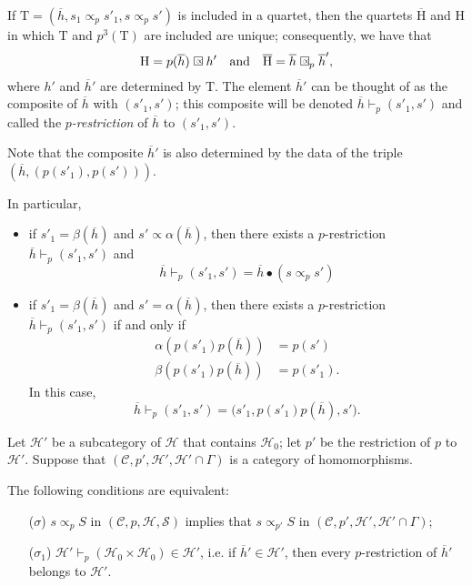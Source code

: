 \documentclass[a4paper,fleqn]{article}
\theoremstyle{plain}
\newenvironment{proposition}[1]
  {\renewcommand\theinnerproposition{#1}\innerproposition}
  {\endinnerproposition}
\theoremstyle{definition}
\newcommand{\oldpage}[1]{{\marginpar{\footnotesize$\bigg\vert$\,\,\,\,\textit{p.~#1}}}}
\newcommand{\textand}{\quad\text{and}\quad}
\newcommand{\CC}{\mathcal{C}}
\newcommand{\HH}{\mathcal{H}}
\newcommand{\rHH}{\mathrm{H}}
\renewcommand{\SS}{\mathcal{S}}
\newcommand{\subs}{\mathrel{\propto}}
\newcommand{\sqsubs}{\mathrel{\mathrlap{\square}\raisebox{.17em}{\scaleobj{0.65}{\,\,\propto}}}}
\newcommand{\smallbullet}{\bullet}
\begin{document}
If $\mathrm{T}=(\overline{h},s_1\subs_p s'_1,s\subs_p s')$ is included in a quartet, then the quartets $\overline{\rHH}$ and $\rHH$ in which $\mathrm{T}$ and $p^3(\mathrm{T})$ are included are unique;
consequently, we have that
\[
  \rHH = p(\overline{h})\sqsubs h'
  \textand
  \overline{\rHH} = \overline{h}\sqsubs_p \overline{h}',
\]
\oldpage{367}
where $h'$ and $\overline{h}'$ are determined by $\mathrm{T}$.
The element $\overline{h}'$ can be thought of as the composite of $\overline{h}$ with $(s'_1,s')$;
this composite will be denoted $\overline{h}\vdash_p(s'_1,s')$ and called the \emph{$p$-restriction} of $\overline{h}$ to $(s'_1,s')$.

Note that the composite $\overline{h}'$ is also determined by the data of the triple $(\overline{h},(p(s'_1),p(s')))$.

In particular,

\begin{itemize}
  \item if $s'_1=\beta(\overline{h})$ and $s'\subs\alpha(\overline{h})$, then there exists a $p$-restriction $\overline{h}\vdash_p(s'_1,s')$ and
    \[
      \overline{h}\vdash_p(s'_1,s')
      = \overline{h}\smallbullet(s\subs_p s')
    \]
  \item if $s'_1=\beta(\overline{h})$ and $s'=\alpha(\overline{h})$, then there exists a $p$-restriction $\overline{h}\vdash_p(s'_1,s')$ if and only if
    \[
      \begin{aligned}
        \alpha(p(s'_1)p(\overline{h}))
        &= p(s')
      \\\beta(p(s'_1)p(\overline{h}))
        &= p(s'_1).
      \end{aligned}
    \]
    In this case,
    \[
      \overline{h}\vdash_p(s'_1,s')
      = \big(
        s'_1, p(s'_1)p(\overline{h}), s'
      \big).
    \]
\end{itemize}

Let $\HH'$ be a subcategory of $\HH$ that contains $\HH_0$;
let $p'$ be the restriction of $p$ to $\HH'$.
Suppose that $(\CC,p',\HH',\HH'\cap\Gamma)$ is a category of homomorphisms.

\begin{proposition}{10}
\label{proposition:i-10}
  The following conditions are equivalent:

  \begin{enumerate}
    \item[\normalfont($\sigma$)] $s\subs_p S$ in $(\CC,p,\HH,\SS)$ implies that $s\subs_{p'}S$ in $(\CC,p',\HH',\HH'\cap\Gamma)$;

    \item[\normalfont($\sigma_1$)] $\HH'\vdash_p(\HH_0\times\HH_0)\in\HH'$, i.e. if $\overline{h}'\in\HH'$, then every $p$-restriction of $\overline{h}'$ belongs to $\HH'$.
  \end{enumerate}
\end{proposition}
\end{document}
